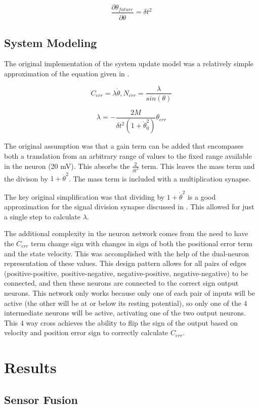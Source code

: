 \documentclass[letterpaper, 10 pt, conference]{IEEEconf} %
\newcommand{\myref}[1]{\hyperref[#1]{\Cref{#1}}}
\newcommand{\bbs}[1]{\section{#1}}
\newcommand{\bbss}[1]{\subsection{#1}}
\begin{document}
\begin{equation}
\dfrac{\partial \theta_{future}}{\partial \ddot{\theta}} = \delta t^{2}
\end{equation}

\bbss{System Modeling}

The original implementation of the system update model was a relatively simple approximation of the equation given in \myref{sec:systemImprovement}.

\begin{equation}
C_{err} = \lambda \dot{\theta}, N_{err} = \dfrac{\lambda}{sin(\theta)}
\end{equation}

\begin{equation}
\lambda 
=
- \dfrac{2M}{\delta t^{2} (1 + \dot{\theta}_{0}^{2})} \theta_{err}
\end{equation}

The original assumption was that a gain term can be added that encompases both a translation from an arbitrary range of values to the fixed range available in the neuron (20 mV). This absorbs the $\frac{2}{\delta t^{2}}$ term. This leaves
the mass term and the divison by $1 + \dot{\theta}^{2}$. The mass term is included with a multiplication synapse. 

The key original simplification was that
dividing by $1 + \dot{\theta}^{2}$ is a good approximation for the signal division synapse discussed in \cite{NickFunctionalSubnetwork}. This allowed for
just a single step to calculate $\lambda$.

The additional complexity in the neuron network comes from the need to have the $C_{err}$ term change sign with changes in sign of both the positional error term and the state velocity. This was accomplished with the help of the dual-neuron representation of these values. This design pattern allows for all pairs of edges (positive-positive, positive-negative, negative-positive, negative-negative) to be connected, and then these neurons are connected to the correct sign output neurons. This network only works because only one of each pair of inputs will be active (the other will be at or below its resting potential), so only one of the 4 intermediate neurons will be active, activating one of the two output neurons. This 4 way cross achieves the ability to flip the sign of the output based on velocity and position error sign to correctly calculate $C_{err}$.

\bbs{Results}
\label{chap:results}

\bbss{Sensor Fusion}
\end{document}
